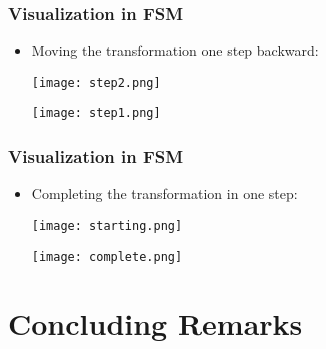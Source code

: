 \documentclass{beamer}
\begin{document}
\begin{frame}[fragile]
\frametitle{Visualization in FSM}
\begin{scriptsize}
\begin{itemize}
\normalsize

\item<1-> Moving the transformation one step backward: \newline

\noindent
\begin{minipage}[t]{0.48\linewidth}
\centering
\texttt{[image: step2.png]}
\end{minipage}
\hfill
\begin{minipage}[t]{0.48\linewidth}
\centering
\texttt{[image: step1.png]}
\end{minipage}


\end{itemize}
\end{scriptsize}
\end{frame}

\begin{frame}[fragile]
\frametitle{Visualization in FSM}
\begin{scriptsize}
\begin{itemize}

\item<1-> Completing the transformation in one step:

\noindent
\begin{minipage}[t]{0.48\linewidth}
\centering
\texttt{[image: starting.png]}
\end{minipage}
\hfill
\begin{minipage}[t]{0.48\linewidth}
\centering
\texttt{[image: complete.png]}
\end{minipage}


\end{itemize}
\end{scriptsize}
\end{frame}


\section{Concluding Remarks}
\end{document}
